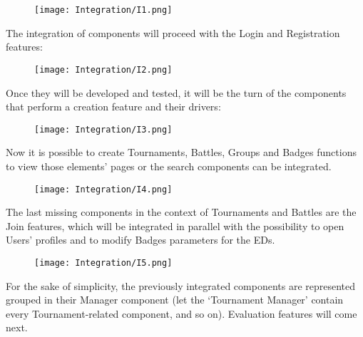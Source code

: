 \begin{figure}[H]
    \begin{center}
        \texttt{[image: Integration/I1.png]}
        \label{fig:Integration_1}%
    \end{center}
\end{figure}


The integration of components will proceed with the Login and Registration features:

\begin{figure}[H]
    \begin{center}
        \texttt{[image: Integration/I2.png]}
        \label{fig:Integration_2}%
    \end{center}
\end{figure}

Once they will be developed and tested, it will be the turn of the components that perform a creation feature and their drivers:

\begin{figure}[H]
    \begin{center}
        \texttt{[image: Integration/I3.png]}
        \label{fig:Integration_3}%
    \end{center}
\end{figure}

Now it is possible to create Tournaments, Battles, Groups and Badges functions to view those elements’ pages or the search components can be integrated.


\begin{figure}[H]
    \begin{center}
        \texttt{[image: Integration/I4.png]}
        \label{fig:Integration_4}%
    \end{center}
\end{figure}

The last missing components in the context of Tournaments and Battles are the Join features, which will be integrated in parallel with the possibility to open Users’ profiles and to modify Badges parameters for the EDs.


\begin{figure}[H]
    \begin{center}
        \texttt{[image: Integration/I5.png]}
        \label{fig:Integration_5}%
    \end{center}
\end{figure}

For the sake of simplicity, the previously integrated components are represented grouped in their Manager component (let the ‘Tournament Manager’ contain every Tournament-related component, and so on). Evaluation features will come next.

